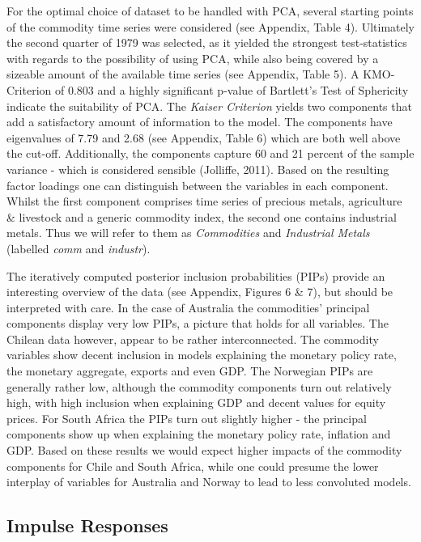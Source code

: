 \documentclass[12pt,]{article}
\begin{document}
For the optimal choice of dataset to be handled with PCA, several
starting points of the commodity time series were considered (see
Appendix, Table 4). Ultimately the second quarter of 1979 was selected,
as it yielded the strongest test-statistics with regards to the
possibility of using PCA, while also being covered by a sizeable amount
of the available time series (see Appendix, Table 5). A KMO-Criterion of
0.803 and a highly significant p-value of Bartlett's Test of Sphericity
indicate the suitability of PCA. The \emph{Kaiser Criterion} yields two
components that add a satisfactory amount of information to the model.
The components have eigenvalues of 7.79 and 2.68 (see Appendix, Table 6)
which are both well above the cut-off. Additionally, the components
capture 60 and 21 percent of the sample variance - which is considered
sensible (Jolliffe, 2011). Based on the resulting factor loadings one
can distinguish between the variables in each component. Whilst the
first component comprises time series of precious metals, agriculture \&
livestock and a generic commodity index, the second one contains
industrial metals. Thus we will refer to them as \emph{Commodities} and
\emph{Industrial Metals} (labelled \emph{comm} and \emph{industr}).

The iteratively computed posterior inclusion probabilities (PIPs)
provide an interesting overview of the data (see Appendix, Figures 6 \&
7), but should be interpreted with care. In the case of Australia the
commodities' principal components display very low PIPs, a picture that
holds for all variables. The Chilean data however, appear to be rather
interconnected. The commodity variables show decent inclusion in models
explaining the monetary policy rate, the monetary aggregate, exports and
even GDP. The Norwegian PIPs are generally rather low, although the
commodity components turn out relatively high, with high inclusion when
explaining GDP and decent values for equity prices. For South Africa the
PIPs turn out slightly higher - the principal components show up when
explaining the monetary policy rate, inflation and GDP. Based on these
results we would expect higher impacts of the commodity components for
Chile and South Africa, while one could presume the lower interplay of
variables for Australia and Norway to lead to less convoluted models.

\subsection{Impulse Responses}\label{impulse-responses}
\end{document}
